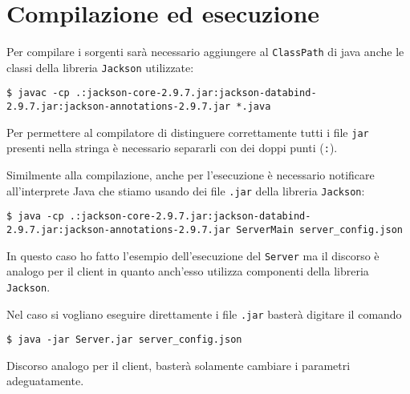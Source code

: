 \section{Compilazione ed esecuzione}
Per compilare i sorgenti sarà necessario aggiungere al \verb|ClassPath| di java anche le classi
della libreria \verb|Jackson| utilizzate:
\begin{lstlisting}
$ javac -cp .:jackson-core-2.9.7.jar:jackson-databind-2.9.7.jar:jackson-annotations-2.9.7.jar *.java
\end{lstlisting}
Per permettere al compilatore di distinguere correttamente tutti i file \verb|jar| presenti nella
stringa è necessario separarli con dei doppi punti (\verb|:|).

Similmente alla compilazione, anche per l'esecuzione è necessario notificare all'interprete Java
che stiamo usando dei file \verb|.jar| della libreria \verb|Jackson|:
\begin{lstlisting}
$ java -cp .:jackson-core-2.9.7.jar:jackson-databind-2.9.7.jar:jackson-annotations-2.9.7.jar ServerMain server_config.json
\end{lstlisting}
In questo caso ho fatto l'esempio dell'esecuzione del \verb|Server| ma il discorso è analogo per il
client in quanto anch'esso utilizza componenti della libreria \verb|Jackson|.

Nel caso si vogliano eseguire direttamente i file \verb|.jar| basterà digitare il comando
\begin{lstlisting}
$ java -jar Server.jar server_config.json
\end{lstlisting}
Discorso analogo per il client, basterà solamente cambiare i parametri adeguatamente.